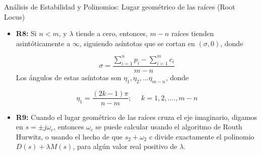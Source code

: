 \documentclass{beamer}
\begin{document}
\begin{frame}{Análisis de Estabilidad y Polinomios: Lugar geométrico de las raíces (Root Locus)}
\begin{justify}

\begin{itemize}
    \justifying
    \item \textbf {R8:} Si $n< m$, y $\lambda$ tiende a cero, entonces, ${m} - {n}$ raíces tienden asintóticamente a $ \infty $, siguiendo asíntotas que se cortan en $(\sigma, 0)$, donde
    
    \vspace{0.3cm}
    {\small
    \begin{equation}\label{regla-8}
        \sigma = \frac{\sum_{i=1}^{n} p_i - \sum_{i=1}^{m} c_i}{m-n} 
    \end{equation}
    }
    Los ángulos de estas asíntotas son $\eta_1, \eta_2,...\eta_{m-n}$, donde

    {\small
    \begin{equation}\label{regla-8.1}
        \eta_1 = \frac{(2k-1)\pi}{n-m} ;  \ \ \  \ \ \  k = 1,2,....,m-n
    \end{equation}
    }
    
    \vspace{0.3cm}
    \item \textbf{R9:} Cuando el lugar geométrico de las raíces cruza el eje imaginario, digamos en $s = ±j\omega_c$, entonces $\omega_c$ se puede calcular usando el algoritmo de Routh Hurwitz, o usando el hecho de que $s_2 + \omega_2$ c divide exactamente el polinomio $D(s) + \lambda M(s)$, para algún valor real positivo de $\lambda$.

\end{itemize}

\end{justify}
\end{frame}
\end{document}

